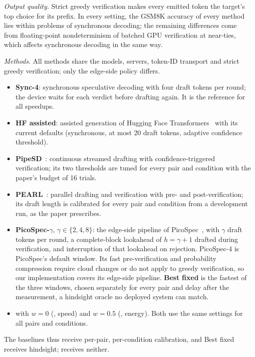 \emph{Output quality.} Strict greedy verification makes every emitted token the target's top choice for its prefix. In every setting, the GSM8K accuracy of every method lies within  problems of synchronous decoding; the remaining differences come from floating-point nondeterminism of batched GPU verification at near-ties, which affects synchronous decoding in the same way.

\emph{Methods.} All methods share the models, servers, token-ID transport and strict greedy verification; only the edge-side policy differs.
\begin{itemize}
\item \textbf{Sync-4}: synchronous speculative decoding with four draft tokens per round; the device waits for each verdict before drafting again. It is the reference for all speedups.
\item \textbf{HF assisted}: assisted generation of Hugging Face Transformers~\cite{transformers2020} with its current defaults (synchronous, at most 20 draft tokens, adaptive confidence threshold).
\item \textbf{PipeSD}~\cite{pipesd2026}: continuous streamed drafting with confidence-triggered verification; its two thresholds are tuned for every pair and condition with the paper's budget of 16 trials.
\item \textbf{PEARL}~\cite{pearl2025}: parallel drafting and verification with pre- and post-verification; its draft length is calibrated for every pair and condition from a development run, as the paper prescribes.
\item \textbf{PicoSpec-$\gamma$}, $\gamma\in\{2,4,8\}$: the edge-side pipeline of PicoSpec~\cite{picospec2026}, with $\gamma$ draft tokens per round, a complete-block lookahead of $h=\gamma+1$ drafted during verification, and interruption of that lookahead on rejection. PicoSpec-4 is PicoSpec's default window. Its fast pre-verification and probability compression require cloud changes or do not apply to greedy verification, so our implementation covers its edge-side pipeline. \textbf{Best fixed} is the fastest of the three windows, chosen separately for every pair and delay after the measurement, a hindsight oracle no deployed system can match.
\item \textbf{\cape{}} with $w=0$ (\capes{}, speed) and $w=0.5$ (\capee{}, energy). Both use the same settings for all pairs and conditions.
\end{itemize}
The baselines thus receive per-pair, per-condition calibration, and Best fixed receives hindsight; \cape{} receives neither.

